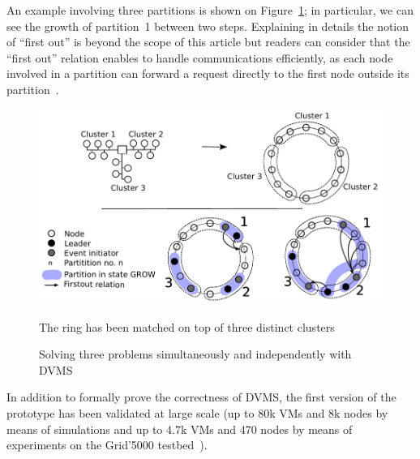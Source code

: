 An example involving three partitions is shown on Figure~\ref{fig:isp}; in
particular, we can see the growth of partition~1 between two steps. 
Explaining in details the notion of ``first out'' is beyond the scope of this article but readers can consider that the ``first out'' relation enables
to handle communications efficiently, as each node involved in a partition
can forward a request directly to the first node outside its partition~\cite{quesnel:cpe2012}.
\begin{figure}[h!]
  \centering
  \includegraphics[width=0.9\linewidth]{Figures/resourceAcquisition-standard.pdf}
  \caption{Solving three problems simultaneously and independently with DVMS}%
\small{The ring has been matched on top of three distinct clusters}
  \label{fig:isp}%
\end{figure}

In addition to formally prove the correctness of DVMS, the first version of the prototype
has been validated at large scale (up to 80k VMs and 8k nodes by means of simulations and up to 4.7k VMs and 470 nodes by means of experiments on the Grid'5000
testbed~\cite{quesnel:ispa2013}).


